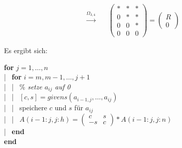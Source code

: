 \begin{align*}
  \quad \overset{\Omega_{3,4}}{\longrightarrow} \quad	
     & \left(\begin{array}{cccc}
               * & *  & *  \\
               0 & *  & * \\ 
               0 & 0 & * \\
               0 & 0 & 0
             \end{array}\right)
                       = \begin{pmatrix}
                         R \\ 0 
                       \end{pmatrix}
\end{align*}


Es ergibt sich:

 

\begin{pseudocode}{0.7\linewidth}
  \textbf{for} $j=1, \dotsc , n$ \\
  |~	\>	\textbf{for} $i=m, m-1, \dotsc , j+1$ \\
  |~	\>		|~	\>\% \textit{setze $a_{ij}$ auf 0} \\
  |~	\>		|~	\>$[c,s] = givens(a_{i-1,j}, \dotsc, a_{ij}) $\\
  |~	\>		|~	\>speichere $c$ und $s$ für $a_{ij}$ \\
  |~	\>		|~	\>$A(i-1:j, j:h) =\left( \begin{smallmatrix}c & s\\ -s & c	\end{smallmatrix}\right) * A(i-1:j, j:n)$ \\
  |~	\> \textbf{end}\\
  \textbf{end}							
\end{pseudocode}

